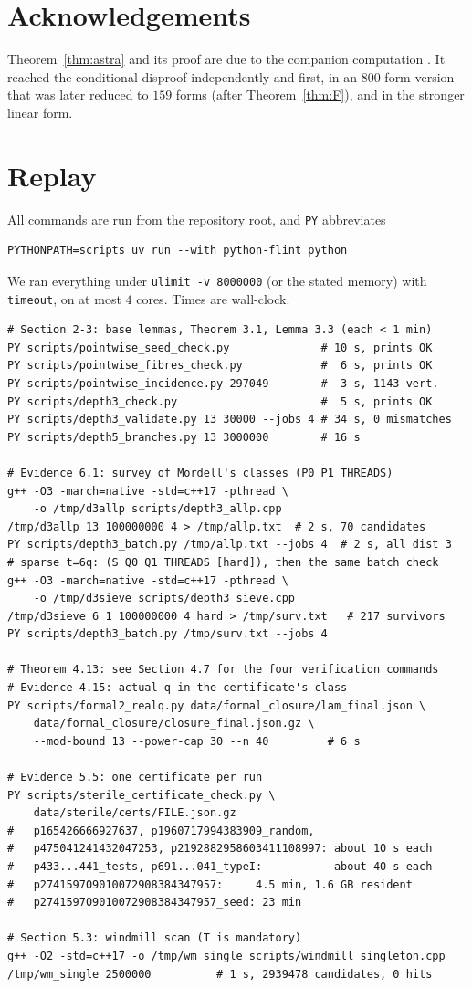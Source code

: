 \documentclass[11pt,reqno]{amsart}
\theoremstyle{definition}
\begin{document}
\section*{Acknowledgements}
Theorem~\ref{thm:astra} and its proof are due to the companion computation
\cite{AS}.  It reached the conditional disproof independently and first,
in an $800$-form version that was later reduced to $159$ forms (after
Theorem~\ref{thm:F}), and in the stronger linear form.

\appendix
\section{Replay}\label{app:replay}
All commands are run from the repository root, and \verb|PY| abbreviates
\begin{verbatim}
PYTHONPATH=scripts uv run --with python-flint python
\end{verbatim}
We ran everything under \verb|ulimit -v 8000000| (or the stated memory) with
\verb|timeout|, on at most $4$ cores.  Times are wall-clock.
{\small
\begin{verbatim}
# Section 2-3: base lemmas, Theorem 3.1, Lemma 3.3 (each < 1 min)
PY scripts/pointwise_seed_check.py              # 10 s, prints OK
PY scripts/pointwise_fibres_check.py            #  6 s, prints OK
PY scripts/pointwise_incidence.py 297049        #  3 s, 1143 vert.
PY scripts/depth3_check.py                      #  5 s, prints OK
PY scripts/depth3_validate.py 13 30000 --jobs 4 # 34 s, 0 mismatches
PY scripts/depth5_branches.py 13 3000000        # 16 s

# Evidence 6.1: survey of Mordell's classes (P0 P1 THREADS)
g++ -O3 -march=native -std=c++17 -pthread \
    -o /tmp/d3allp scripts/depth3_allp.cpp
/tmp/d3allp 13 100000000 4 > /tmp/allp.txt  # 2 s, 70 candidates
PY scripts/depth3_batch.py /tmp/allp.txt --jobs 4  # 2 s, all dist 3
# sparse t=6q: (S Q0 Q1 THREADS [hard]), then the same batch check
g++ -O3 -march=native -std=c++17 -pthread \
    -o /tmp/d3sieve scripts/depth3_sieve.cpp
/tmp/d3sieve 6 1 100000000 4 hard > /tmp/surv.txt   # 217 survivors
PY scripts/depth3_batch.py /tmp/surv.txt --jobs 4

# Theorem 4.13: see Section 4.7 for the four verification commands
# Evidence 4.15: actual q in the certificate's class
PY scripts/formal2_realq.py data/formal_closure/lam_final.json \
    data/formal_closure/closure_final.json.gz \
    --mod-bound 13 --power-cap 30 --n 40         # 6 s

# Evidence 5.5: one certificate per run
PY scripts/sterile_certificate_check.py \
    data/sterile/certs/FILE.json.gz
#   p165426666927637, p1960717994383909_random,
#   p475041241432047253, p2192882958603411108997: about 10 s each
#   p433...441_tests, p691...041_typeI:           about 40 s each
#   p274159709010072908384347957:     4.5 min, 1.6 GB resident
#   p274159709010072908384347957_seed: 23 min

# Section 5.3: windmill scan (T is mandatory)
g++ -O2 -std=c++17 -o /tmp/wm_single scripts/windmill_singleton.cpp
/tmp/wm_single 2500000          # 1 s, 2939478 candidates, 0 hits
\end{verbatim}}
\end{document}
